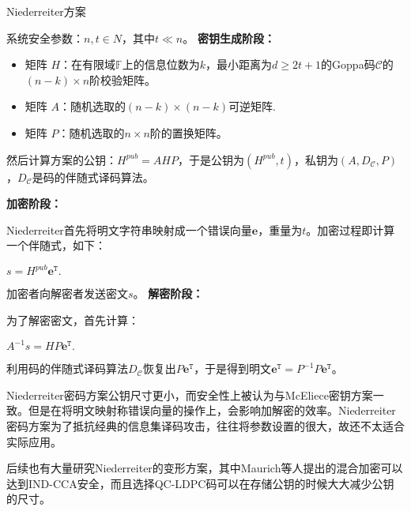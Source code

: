 \begin{breakablealgorithm}
	\small
	\renewcommand{\algorithmicrequire}{\textbf{Input:}}
	\renewcommand{\algorithmicensure}{\textbf{Output:}}
	\caption{Niederreiter方案}
	\label{alg:Niederreiter}
	\begin{algorithmic}
		\State
		系统安全参数：$n,t \in N$，其中$t \ll n$。
		\State
		\textbf{密钥生成阶段：}
		
		\begin{itemize}
			\item 矩阵 $H$：在有限域$\mathbb{F}$上的信息位数为$k$，最小距离为$d \geq 2t + 1$的Goppa码$\mathcal{C}$的$(n-k) \times n$阶校验矩阵。
			\item 矩阵 $A$：随机选取的$(n-k) \times (n-k)$可逆矩阵.
			\item 矩阵 $P$：随机选取的$n \times n$阶的置换矩阵。			
		\end{itemize}
	
		然后计算方案的公钥：$H^{pub} = AHP$，于是公钥为$(H^{pub}, t)$，私钥为$(A,D_\mathcal{C},P)$，$D_\mathcal{C}$是码的伴随式译码算法。
		
		\State
		\textbf{加密阶段：}
		
		Niederreiter首先将明文字符串映射成一个错误向量$\mathbf{e}$，重量为$t$。加密过程即计算一个伴随式，如下：
		
		\begin{center}
			$s = H^{pub}\mathbf{e}^\mathtt{T}.$
		\end{center}
		
		加密者向解密者发送密文$s$。
		\State
		\textbf{解密阶段：}
		
		为了解密密文，首先计算：
		\begin{center}
			$A^{-1}s = HP\mathbf{e}^\mathtt{T}.$
		\end{center}
	    利用码的伴随式译码算法$D_\mathcal{C}$恢复出$P\mathbf{e}^\mathtt{T}$，于是得到明文$\mathbf{e}^\mathtt{T} = P^{-1}P\mathbf{e}^\mathtt{T}$。		
	\end{algorithmic}
\end{breakablealgorithm}

Niederreiter密码方案公钥尺寸更小，而安全性上被认为与McEliece密钥方案一致。但是在将明文映射称错误向量的操作上，会影响加解密的效率。Niederreiter密码方案为了抵抗经典的信息集译码攻击，往往将参数设置的很大，故还不太适合实际应用。

后续也有大量研究Niederreiter的变形方案，其中Maurich等人提出的混合加密\cite{Von2016IND}可以达到IND-CCA安全，而且选择QC-LDPC码可以在存储公钥的时候大大减少公钥的尺寸。
